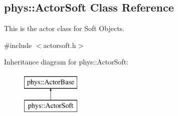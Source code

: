 \hypertarget{classphys_1_1ActorSoft}{
\subsection{phys::ActorSoft Class Reference}
\label{classphys_1_1ActorSoft}
}


This is the actor class for Soft Objects.  




{\ttfamily \#include $<$actorsoft.h$>$}

Inheritance diagram for phys::ActorSoft:\begin{figure}[H]
\begin{center}
\leavevmode
\includegraphics[height=2.000000cm]{classphys_1_1ActorSoft}
\end{center}
\end{figure}
